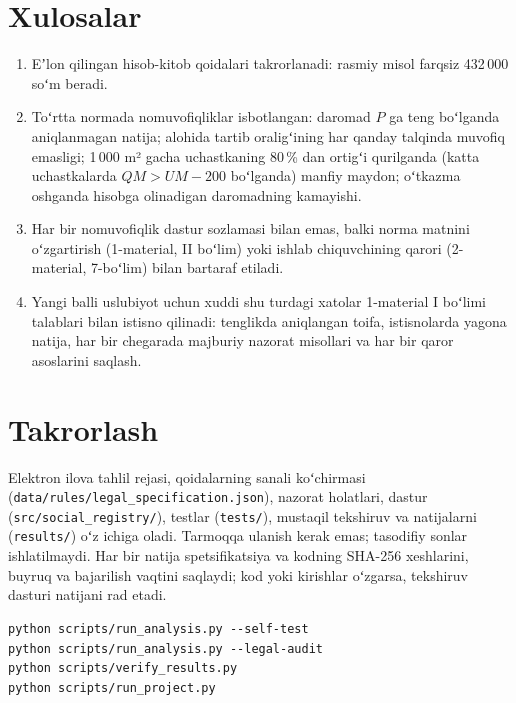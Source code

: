 \documentclass[12pt,a4paper]{extarticle}
\begin{document}
\section{Xulosalar}
\begin{enumerate}[leftmargin=1.27cm]
\item Eʼlon qilingan hisob-kitob qoidalari takrorlanadi: rasmiy misol farqsiz 432\,000 soʻm beradi.
\item Toʻrtta normada nomuvofiqliklar isbotlangan: daromad $P$ ga teng boʻlganda aniqlanmagan natija; alohida tartib oraligʻining har qanday talqinda muvofiq emasligi; 1\,000 m² gacha uchastkaning 80\,\% dan ortigʻi qurilganda (katta uchastkalarda $QM>UM-200$ boʻlganda) manfiy maydon; oʻtkazma oshganda hisobga olinadigan daromadning kamayishi.
\item Har bir nomuvofiqlik dastur sozlamasi bilan emas, balki norma matnini oʻzgartirish (1-material, II boʻlim) yoki ishlab chiquvchining qarori (2-material, 7-boʻlim) bilan bartaraf etiladi.
\item Yangi balli uslubiyot uchun xuddi shu turdagi xatolar 1-material I boʻlimi talablari bilan istisno qilinadi: tenglikda aniqlangan toifa, istisnolarda yagona natija, har bir chegarada majburiy nazorat misollari va har bir qaror asoslarini saqlash.
\end{enumerate}

\appendix
\section{Takrorlash}
Elektron ilova tahlil rejasi, qoidalarning sanali koʻchirmasi (\nolinkurl{data/rules/legal_specification.json}), nazorat holatlari, dastur (\nolinkurl{src/social_registry/}), testlar (\nolinkurl{tests/}), mustaqil tekshiruv va natijalarni (\nolinkurl{results/}) oʻz ichiga oladi. Tarmoqqa ulanish kerak emas; tasodifiy sonlar ishlatilmaydi. Har bir natija spetsifikatsiya va kodning SHA-256 xeshlarini, buyruq va bajarilish vaqtini saqlaydi; kod yoki kirishlar oʻzgarsa, tekshiruv dasturi natijani rad etadi.

\begingroup\fontsize{11bp}{13.2bp}\selectfont
\begin{verbatim}
python scripts/run_analysis.py --self-test
python scripts/run_analysis.py --legal-audit
python scripts/verify_results.py
python scripts/run_project.py
\end{verbatim}
\endgroup
\end{document}
